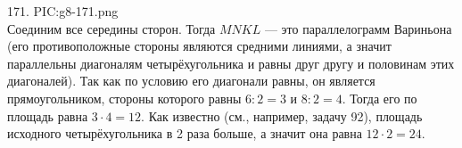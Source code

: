 171. {{PIC:g8-171.png}}\\
Соединим все середины сторон. Тогда $MNKL$ --- это параллелограмм Вариньона (его противоположные стороны являются средними линиями, а значит параллельны диагоналям четырёхугольника и равны друг другу и половинам этих диагоналей). Так как по условию его диагонали равны, он является прямоугольником, стороны которого равны $6:2=3$ и $8:2=4.$ Тогда его по площадь равна $3\cdot4=12.$ Как известно (см., например, задачу 92), площадь исходного четырёхугольника в 2 раза больше, а значит она равна $12\cdot2=24.$\\
